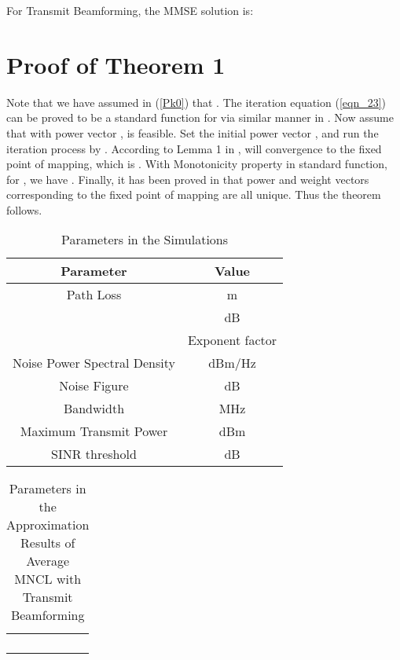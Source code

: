 \documentclass[draftcls,onecolumn,peerview,12pt]{IEEEtran}
\begin{document}
For Transmit Beamforming, the MMSE solution is:





\section{Proof of Theorem 1}
Note that we have assumed in (\ref{Pk0}) that . The iteration equation (\ref{eqn_23}) can be proved to be a
standard function \cite{23_FrameworkUplink1995} for  via similar manner in \cite{13_JointOptimal1998}. Now assume
that with power vector ,  is feasible. Set the
initial power vector , and run the
iteration process by .
According to Lemma 1 in \cite{23_FrameworkUplink1995},  will convergence to the fixed point of mapping, which is
. With
Monotonicity property in standard function, for ,
we have . Finally, it has been
proved in \cite{13_JointOptimal1998} that power and weight vectors
corresponding to the fixed point of mapping are all unique. Thus the
theorem follows.




\newpage
\begin{table}
\caption{Parameters in the Simulations} \centering \label{table I}
\begin{tabular}{c||c}
\hline \textbf{Parameter} & \textbf{Value} \\
\hline \textrm{Path Loss} & \textrm{m} \\
                          & \textrm{dB} \\
                          & \textrm{Exponent factor}  \\
\hline \textrm{Noise Power Spectral Density} & \textrm{dBm/Hz} \\
\hline \textrm{Noise Figure} & \textrm{dB} \\
\hline \textrm{Bandwidth} & \textrm{MHz} \\
\hline \textrm{Maximum Transmit Power} & \textrm{dBm} \\
\hline \textrm{SINR threshold} &\textrm{dB} \\
\hline
\end{tabular}
\end{table}

\begin{table}
\caption{Parameters in the Approximation Results of Average MNCL
with Transmit Beamforming} \centering \label{table II}
\begin{tabular}{|c|c|c|c|c|}
\hline  &  &  &  &  \\
\hline
\hline  &  &  &  &  \\
\hline  &  &  &  &  \\
\hline  &  &  &  &  \\
\hline  &  &  &  &  \\
\hline
\end{tabular}
\end{table}
\end{document}
